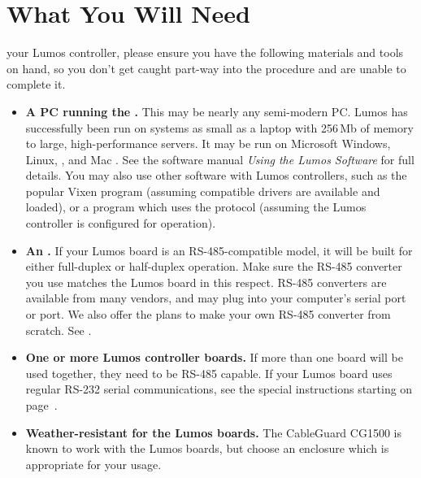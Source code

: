 \documentclass[letterpaper,twoside,onecolumn,openright,final]{memoir}
\begin{document}
\chapter{What You Will Need}\label{ch:materials}
 your Lumos controller, please ensure
you have the following materials and tools on hand, so you don't get caught part-way
into the procedure and are unable to complete it.

\begin{itemize}
	\item	{\bfseries A PC running the .}
		This may be nearly any semi-modern PC.  Lumos has successfully been run on systems as small as 
		a laptop with 256\,Mb of memory to large, high-performance servers.  It may be run on Microsoft
		Windows, Linux, , and Mac .  See the software manual \emph{Using the Lumos Software} 
		for full details.  You may also use other software with Lumos controllers, such as the popular
		Vixen program (assuming compatible drivers are available and loaded), or a program which uses the
		 protocol (assuming the Lumos controller is configured for  operation).
		
	\item	{\bfseries An .}
		If your Lumos board is an RS-485-compatible model, it will be built for either full-duplex or half-duplex
		operation.  Make sure the RS-485 converter you use matches the Lumos board in this respect.  RS-485
		converters are available from many vendors, and may plug into your computer's serial port or 
		port.  We also offer the plans to make your own RS-485 converter from scratch.
		See .

	\item	{\bfseries One or more Lumos controller boards.}  If more than one board will be used together,
		they need to be RS-485 capable.  If your Lumos board uses regular RS-232 serial communications,
		see the special instructions starting on page~\pageref{sec:rs232}.

	\item	{\bfseries Weather-resistant  for the Lumos boards.}  The Cable\-Guard\textsuperscript{\textregistered}
		CG1500 
		is known to work with the Lumos boards, but choose an enclosure which is appropriate for your usage.


\end{itemize}
\end{document}
